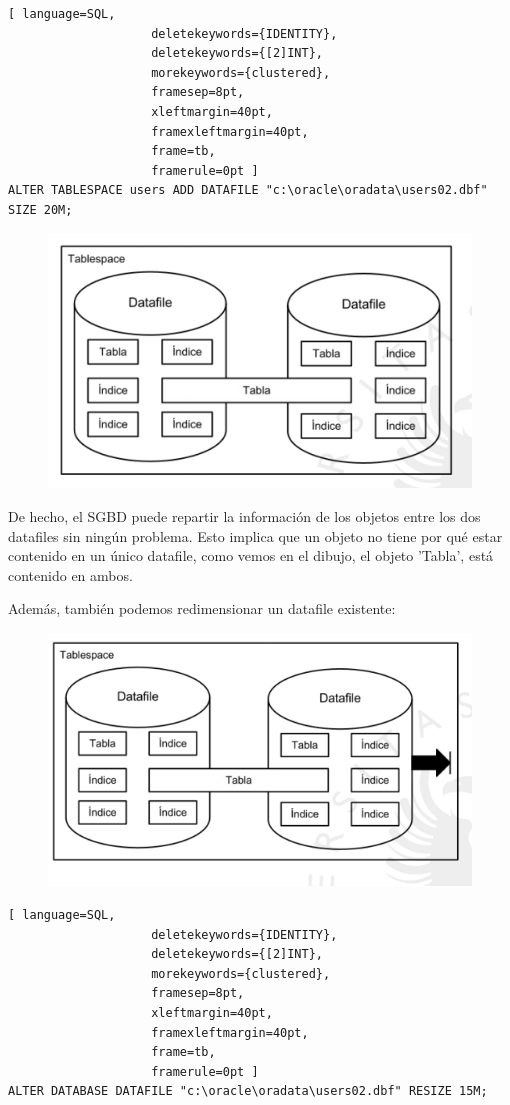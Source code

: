 \begin{lstlisting}[ language=SQL,
                    deletekeywords={IDENTITY},
                    deletekeywords={[2]INT},
                    morekeywords={clustered},
                    framesep=8pt,
                    xleftmargin=40pt,
                    framexleftmargin=40pt,
                    frame=tb,
                    framerule=0pt ]
ALTER TABLESPACE users ADD DATAFILE "c:\oracle\oradata\users02.dbf" SIZE 20M;
\end{lstlisting}
\begin{figure}[H]
  \center
  \includegraphics[scale=0.4]{img/11.png}
\end{figure}

De hecho, el SGBD puede repartir la información de los objetos entre los dos datafiles sin ningún problema. Esto implica que un objeto no tiene por qué estar contenido en un único datafile, como vemos en el dibujo, el objeto 'Tabla', está contenido en ambos.

Además, también podemos redimensionar un datafile existente:

\begin{figure}[H]
  \center
  \includegraphics[scale=0.4]{img/12.png}
\end{figure}
\begin{lstlisting}[ language=SQL,
                    deletekeywords={IDENTITY},
                    deletekeywords={[2]INT},
                    morekeywords={clustered},
                    framesep=8pt,
                    xleftmargin=40pt,
                    framexleftmargin=40pt,
                    frame=tb,
                    framerule=0pt ]
ALTER DATABASE DATAFILE "c:\oracle\oradata\users02.dbf" RESIZE 15M;
\end{lstlisting}

